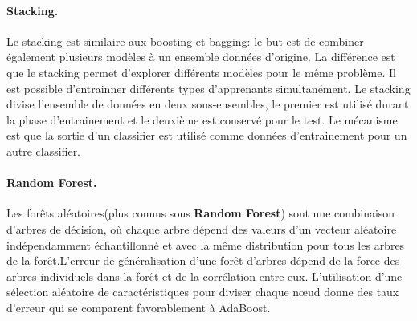 \documentclass[12pt, french]{report}
\begin{document}
\paragraph{Stacking.}
Le stacking est similaire aux boosting et bagging: le but est de combiner également plusieurs modèles à un ensemble données d'origine. La différence est que le stacking permet d'explorer différents modèles pour le même problème. Il est possible d'entrainner différents types d'apprenants simultanément. Le stacking divise l'ensemble de données en deux sous-ensembles, le premier est utilisé durant la phase d'entrainement et le deuxième est conservé pour le test. Le mécanisme est que la sortie d'un classifier est utilisé comme données d'entrainement pour un autre classifier.  

\paragraph{Random Forest.}
Les forêts aléatoires(plus connus sous \textbf{Random Forest}) sont une combinaison d'arbres  de  décision,  où  chaque  arbre  dépend  des  valeurs  d'un  vecteur  aléatoire indépendamment échantillonné et avec la même distribution pour tous les arbres de la forêt.L'erreur  de  généralisation  d'une  forêt  d'arbres  dépend  de  la  force  des  arbres individuels  dans  la  forêt  et  de  la  corrélation  entre  eux.  L'utilisation d'une  sélection aléatoire  de  caractéristiques  pour  diviser  chaque nœud donne des  taux  d'erreur  qui se comparent favorablement à AdaBoost. \cite{key1}\\
\end{document}
